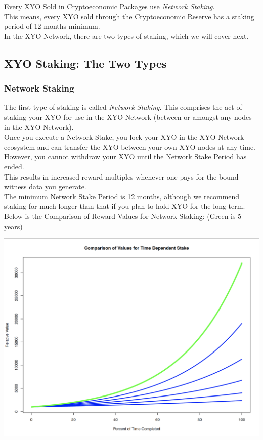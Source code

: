 \documentclass{article}
\begin{document}
Every XYO Sold in Cryptoeconomic Packages use \textit{Network Staking}.\\

This means, every XYO sold through the Cryptoeconomic Reserve has a staking period of 12 months minimum.\\

In the XYO Network, there are two types of staking, which we will cover next.

\subsection{XYO Staking: The Two Types}

\subsubsection{Network Staking}

The first type of staking is called \textit{Network Staking}. This comprises the act of staking your XYO for use in the XYO Network (between or amongst any nodes in the XYO Network).\\

Once you execute a Network Stake, you lock your XYO in the XYO Network ecosystem and can transfer the XYO between your own XYO nodes at any time. However, you cannot withdraw your XYO until the Network Stake Period has ended.\\

This results in increased reward multiples whenever one pays for the bound witness data you generate.\\

The minimum Network Stake Period is 12 months, although we recommend staking for much longer than that if you plan to hold XYO for the long-term.\\

Below is the Comparison of Reward Values for Network Staking: (Green is 5 years)

\includegraphics[width=\textwidth]{staking-time}
\end{document}
